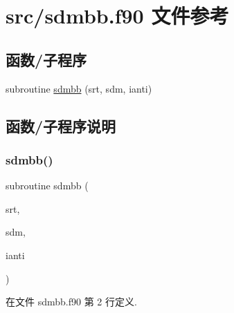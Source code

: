 \hypertarget{sdmbb_8f90}{}\section{src/sdmbb.f90 文件参考}
\label{sdmbb_8f90}
\subsection*{函数/子程序}
\begin{DoxyCompactItemize}
\item 
subroutine \mbox{\hyperlink{sdmbb_8f90_a09c6069770f7fe9d9f7549d9d60c531c}{sdmbb}} (srt, sdm, ianti)
\end{DoxyCompactItemize}


\subsection{函数/子程序说明}
\mbox{\label{sdmbb_8f90_a09c6069770f7fe9d9f7549d9d60c531c}} 
\subsubsection{\texorpdfstring{sdmbb()}{sdmbb()}}
{\footnotesize\ttfamily subroutine sdmbb (\begin{DoxyParamCaption}\item[{}]{srt,  }\item[{}]{sdm,  }\item[{}]{ianti }\end{DoxyParamCaption})}



在文件 sdmbb.\+f90 第 2 行定义.

